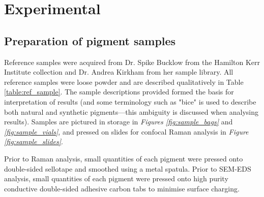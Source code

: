 
\chapter{Experimental} %

\ifpdf
    \graphicspath{{Chapter2/Figs/Raster/}{Chapter2/Figs/PDF/}{Chapter2/Figs/}}
\else
    \graphicspath{{Chapter2/Figs/Vector/}{Chapter2/Figs/}}
\fi


\section[Preparation of samples]{Preparation of pigment samples} 
\label{section2.1}

Reference samples were acquired from Dr. Spike Bucklow from the Hamilton Kerr Institute collection and Dr. Andrea Kirkham from her sample library. All reference samples were loose powder and are described qualitatively in Table \ref{table:ref_sample}. The sample descriptions provided formed the basis for interpretation of results (and some terminology such as "bice" is used to describe both natural and synthetic pigments---this ambiguity is discussed when analysing results). Samples are pictured in storage in \textit{Figures \ref{fig:sample_bags}} and \textit{\ref{fig:sample_vials}}, and pressed on slides for confocal Raman analysis in \textit{Figure \ref{fig:sample_slides}}.

Prior to Raman analysis, small quantities of each pigment were pressed onto double-sided sellotape and smoothed using a metal spatula. Prior to SEM-EDS analysis, small quantities of each pigment were pressed onto high purity conductive double-sided adhesive carbon tabs to minimise surface charging.

